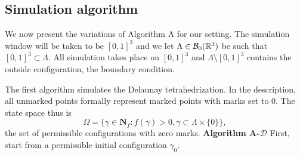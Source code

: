\subsection{Simulation algorithm}
We now present the variations of Algorithm A for our setting. The simulation window will be taken to be $[0,1]^3$ and we let $\Lambda \in \mathcal B_0({\mathbb R^3})$ be such that $[0,1]^3 \subset \Lambda$. All simulation takes place on $[0,1]^3$ and $\Lambda \setminus [0,1]^3$ contains the outside configuration, the boundary condition. 

The first algorithm simulates the Delaunay tetrahedrization. In the description, all unmarked points formally represent marked points with marks set to $0$. The state space thus is
$$\Omega = \{\gamma \in \mathbf N_f: f(\gamma)>0, \gamma \subset \Lambda\times \{0\}\},$$
the set of permissible configurations with zero marks.
\noindent \textbf{Algorithm A-$\mathcal D$} \newline
\noindent First, start from a permissible initial configuration $\gamma_0$.
